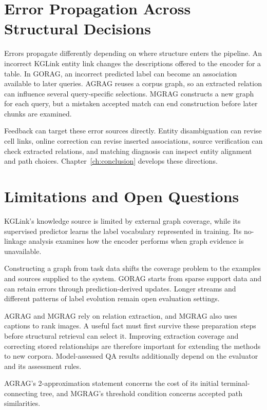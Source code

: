 \section{Error Propagation Across Structural Decisions}
\label{sec:discussion:unit}
Errors propagate differently depending on where structure enters the pipeline. An incorrect KGLink entity link changes the descriptions offered to the encoder for a table. In GORAG, an incorrect predicted label can become an association available to later queries. AGRAG reuses a corpus graph, so an extracted relation can influence several query-specific selections. MGRAG constructs a new graph for each query, but a mistaken accepted match can end construction before later chunks are examined.

Feedback can target these error sources directly. Entity disambiguation can revise cell links, online correction can revise inserted associations, source verification can check extracted relations, and matching diagnosis can inspect entity alignment and path choices. Chapter~\ref{ch:conclusion} develops these directions.

\section{Limitations and Open Questions}
\label{sec:discussion:limitations}
KGLink's knowledge source is limited by external graph coverage, while its supervised predictor learns the label vocabulary represented in training. Its no-linkage analysis examines how the encoder performs when graph evidence is unavailable.

Constructing a graph from task data shifts the coverage problem to the examples and sources supplied to the system. GORAG starts from sparse support data and can retain errors through prediction-derived updates. Longer streams and different patterns of label evolution remain open evaluation settings.

AGRAG and MGRAG rely on relation extraction, and MGRAG also uses captions to rank images. A useful fact must first survive these preparation steps before structural retrieval can select it. Improving extraction coverage and correcting stored relationships are therefore important for extending the methods to new corpora. Model-assessed QA results additionally depend on the evaluator and its assessment rules.

AGRAG's 2-approximation statement concerns the cost of its initial terminal-connecting tree, and MGRAG's threshold condition concerns accepted path similarities.
